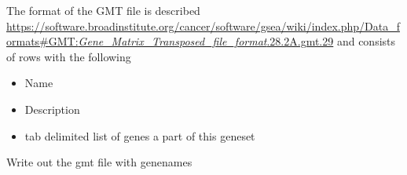 \documentclass[
]{book}
\newenvironment{Shaded}{\begin{snugshade}}{\end{snugshade}}
\newcommand{\AttributeTok}[1]{\textcolor[rgb]{0.77,0.63,0.00}{#1}}
\newcommand{\ControlFlowTok}[1]{\textcolor[rgb]{0.13,0.29,0.53}{\textbf{#1}}}
\newcommand{\FunctionTok}[1]{\textcolor[rgb]{0.00,0.00,0.00}{#1}}
\newcommand{\NormalTok}[1]{#1}
\newcommand{\OtherTok}[1]{\textcolor[rgb]{0.56,0.35,0.01}{#1}}
\newcommand{\SpecialCharTok}[1]{\textcolor[rgb]{0.00,0.00,0.00}{#1}}
\newcommand{\StringTok}[1]{\textcolor[rgb]{0.31,0.60,0.02}{#1}}
\providecommand{\tightlist}{%
  \setlength{\itemsep}{0pt}\setlength{\parskip}{0pt}}
\begin{document}
\begin{Shaded}
\end{Shaded}

The format of the GMT file is described \href{here}{https://software.broadinstitute.org/cancer/software/gsea/wiki/index.php/Data\_formats\#GMT:\emph{Gene\_Matrix\_Transposed\_file\_format}.28.2A.gmt.29} and consists of rows with the following

\begin{itemize}
\tightlist
\item
  Name
\item
  Description
\item
  tab delimited list of genes a part of this geneset
\end{itemize}

Write out the gmt file with genenames
\end{document}
